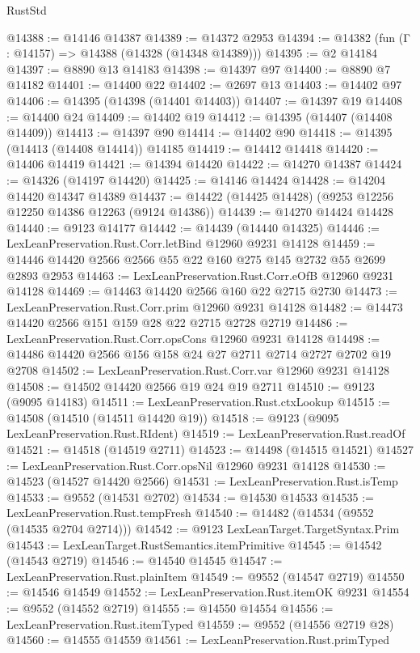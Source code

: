 \begin{lexlean}{RustStd}
\begin{coremodule}
@14388 := @14146 @14387
@14389 := @14372 @2953
@14394 := @14382 (fun (Γ : @14157) => @14388 (@14328 (@14348 @14389)))
@14395 := @2 @14184
@14397 := @8890 @13 @14183
@14398 := @14397 @97
@14400 := @8890 @7 @14182
@14401 := @14400 @22
@14402 := @2697 @13
@14403 := @14402 @97
@14406 := @14395 (@14398 (@14401 @14403))
@14407 := @14397 @19
@14408 := @14400 @24
@14409 := @14402 @19
@14412 := @14395 (@14407 (@14408 @14409))
@14413 := @14397 @90
@14414 := @14402 @90
@14418 := @14395 (@14413 (@14408 @14414)) @14185
@14419 := @14412 @14418
@14420 := @14406 @14419
@14421 := @14394 @14420
@14422 := @14270 @14387
@14424 := @14326 (@14197 @14420)
@14425 := @14146 @14424
@14428 := @14204 @14420 @14347 @14389
@14437 := @14422 (@14425 @14428) (@9253 @12256 @12250 @14386 @12263 (@9124 @14386))
@14439 := @14270 @14424 @14428
@14440 := @9123 @14177
@14442 := @14439 (@14440 @14325)
@14446 := LexLeanPreservation.Rust.Corr.letBind @12960 @9231 @14128
@14459 := @14446 @14420 @2566 @2566 @55 @22 @160 @275 @145 @2732 @55 @2699 @2893 @2953
@14463 := LexLeanPreservation.Rust.Corr.eOfB @12960 @9231 @14128
@14469 := @14463 @14420 @2566 @160 @22 @2715 @2730
@14473 := LexLeanPreservation.Rust.Corr.prim @12960 @9231 @14128
@14482 := @14473 @14420 @2566 @151 @159 @28 @22 @2715 @2728 @2719
@14486 := LexLeanPreservation.Rust.Corr.opsCons @12960 @9231 @14128
@14498 := @14486 @14420 @2566 @156 @158 @24 @27 @2711 @2714 @2727 @2702 @19 @2708
@14502 := LexLeanPreservation.Rust.Corr.var @12960 @9231 @14128
@14508 := @14502 @14420 @2566 @19 @24 @19 @2711
@14510 := @9123 (@9095 @14183)
@14511 := LexLeanPreservation.Rust.ctxLookup
@14515 := @14508 (@14510 (@14511 @14420 @19))
@14518 := @9123 (@9095 LexLeanPreservation.Rust.RIdent)
@14519 := LexLeanPreservation.Rust.readOf
@14521 := @14518 (@14519 @2711)
@14523 := @14498 (@14515 @14521)
@14527 := LexLeanPreservation.Rust.Corr.opsNil @12960 @9231 @14128
@14530 := @14523 (@14527 @14420 @2566)
@14531 := LexLeanPreservation.Rust.isTemp
@14533 := @9552 (@14531 @2702)
@14534 := @14530 @14533
@14535 := LexLeanPreservation.Rust.tempFresh
@14540 := @14482 (@14534 (@9552 (@14535 @2704 @2714)))
@14542 := @9123 LexLeanTarget.TargetSyntax.Prim
@14543 := LexLeanTarget.RustSemantics.itemPrimitive
@14545 := @14542 (@14543 @2719)
@14546 := @14540 @14545
@14547 := LexLeanPreservation.Rust.plainItem
@14549 := @9552 (@14547 @2719)
@14550 := @14546 @14549
@14552 := LexLeanPreservation.Rust.itemOK @9231
@14554 := @9552 (@14552 @2719)
@14555 := @14550 @14554
@14556 := LexLeanPreservation.Rust.itemTyped
@14559 := @9552 (@14556 @2719 @28)
@14560 := @14555 @14559
@14561 := LexLeanPreservation.Rust.primTyped

\end{coremodule}
\end{lexlean}
